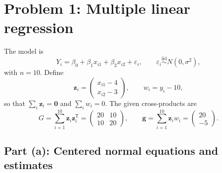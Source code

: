 \documentclass[11pt]{article}
\newcommand{\trans}{\mathsf T}
\begin{document}
\clearpage
\section{Problem 1: Multiple linear regression}

The model is
\[
  Y_i=\beta_0+\beta_1x_{i1}+\beta_2x_{i2}+\varepsilon_i,
  \qquad \varepsilon_i\stackrel{\mathrm{iid}}{\sim}N(0,\sigma^2),
\]
with \(n=10\). Define
\[
  \bm z_i=
  \begin{pmatrix}x_{i1}-4\\x_{i2}-3\end{pmatrix},
  \qquad w_i=y_i-10,
\]
so that \(\sum_i\bm z_i=\bm0\) and \(\sum_iw_i=0\). The given cross-products are
\[
  G=\sum_{i=1}^{10}\bm z_i\bm z_i^\trans
   =\begin{pmatrix}20&10\\10&20\end{pmatrix},
  \qquad
  \bm g=\sum_{i=1}^{10}\bm z_iw_i
   =\begin{pmatrix}20\\-5\end{pmatrix}.
\]

\subsection{Part (a): Centered normal equations and estimates}
\end{document}
